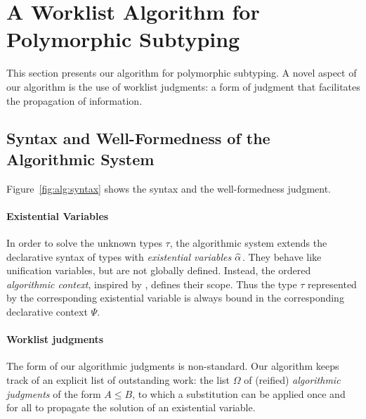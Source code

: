 \section{A Worklist Algorithm for Polymorphic Subtyping}\label{algorithmic_subtyping}

This section presents our algorithm for polymorphic
subtyping. A novel aspect of our algorithm is the use of worklist
judgments: a form of judgment that facilitates the propagation 
of information. 


\subsection{Syntax and Well-Formedness of the Algorithmic System}
Figure~\ref{fig:alg:syntax} shows the
syntax and the well-formedness judgment.  

\paragraph{Existential Variables}
In order to solve the unknown types $\tau$, the algorithmic system extends the
declarative syntax of types with \emph{existential variables} $\al$.  They
behave like unification variables, but are not globally defined. Instead, the
ordered \emph{algorithmic context}, inspired by \citet{dunfield2013complete},
defines their scope. Thus 
the type $\tau$ represented by the corresponding existential variable is
always bound in the corresponding declarative context $\Psi$.

\paragraph{Worklist judgments} The form of our algorithmic judgments is
non-standard. 
Our algorithm keeps track of an explicit list of
outstanding work: the list $\Omega$ of (reified) \emph{algorithmic judgments} 
of the form $A \leq B$,
to which a substitution can be applied once and for all to propagate the solution
of an existential variable. 

